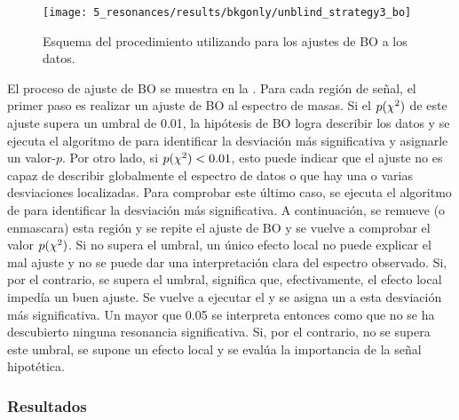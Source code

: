 \begin{figure}[ht!]
    \centering
    \texttt{[image: 5\_resonances/results/bkgonly/unblind\_strategy3\_bo]}
    \caption{Esquema del procedimiento utilizando para los ajustes de \ac{BO} a los datos.}
    \label{fig:results:results:bkgonly:strat}
\end{figure}

El proceso de ajuste de \ac{BO} se muestra en la \Fig{\ref{fig:results:results:bkgonly:strat}}. Para cada región de señal, el primer paso es realizar un ajuste de \ac{BO} al espectro de masas. Si el \(p(\chi^{2})\) de este ajuste supera un umbral de 0.01, la hipótesis de \ac{BO} logra describir los datos y se ejecuta el algoritmo de \bh para identificar la desviación más significativa y asignarle un valor-\(p\). Por otro lado, si \(p(\chi^{2}) < 0.01\), esto puede indicar que el ajuste no es capaz de describir globalmente el espectro de datos o que hay una o varias desviaciones localizadas. Para comprobar este último caso, se ejecuta el algoritmo de \bh para identificar la desviación más significativa. A continuación, se remueve (o enmascara) esta región y se repite el ajuste de \ac{BO} y se vuelve a comprobar el valor \(p(\chi^{2})\). Si no supera el umbral, un único efecto local no puede explicar el mal ajuste y no se puede dar una interpretación clara del espectro observado. Si, por el contrario, se supera el umbral, significa que, efectivamente, el efecto local impedía un buen ajuste. Se vuelve a ejecutar el \bh y se asigna un \pval a esta desviación más significativa. Un \pval mayor que 0.05 se interpreta entonces como que no se ha descubierto ninguna resonancia significativa. Si, por el contrario, no se supera este umbral, se supone un efecto local y se evalúa la importancia de la señal hipotética.



\subsubsection{Resultados}

